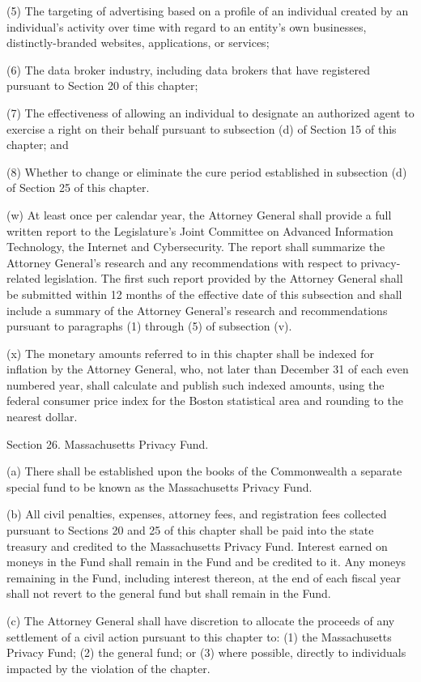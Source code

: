 (5) The targeting of advertising based on a profile of an individual created by an individual’s activity over time with regard to an entity’s own businesses, distinctly-branded websites, applications, or services;

(6) The data broker industry, including data brokers that have registered pursuant to Section 20 of this chapter;

(7) The effectiveness of allowing an individual to designate an authorized agent to exercise a right on their behalf pursuant to subsection (d) of Section 15 of this chapter; and

(8) Whether to change or eliminate the cure period established in subsection (d) of Section 25 of this chapter.

(w) At least once per calendar year, the Attorney General shall provide a full written report to the Legislature’s Joint Committee on Advanced Information Technology, the Internet and Cybersecurity. The report shall summarize the Attorney General’s research and any recommendations with respect to privacy-related legislation. The first such report provided by the Attorney General shall be submitted within 12 months of the effective date of this subsection and shall include a summary of the Attorney General’s research and recommendations pursuant to paragraphs (1) through (5) of subsection (v).

(x) The monetary amounts referred to in this chapter shall be indexed for inflation by the Attorney General, who, not later than December 31 of each even numbered year, shall calculate and publish such indexed amounts, using the federal consumer price index for the Boston statistical area and rounding to the nearest dollar. 

Section 26. Massachusetts Privacy Fund.

(a) There shall be established upon the books of the Commonwealth a separate special fund to be known as the Massachusetts Privacy Fund.

(b) All civil penalties, expenses, attorney fees, and registration fees collected pursuant to Sections 20 and 25 of this chapter shall be paid into the state treasury and credited to the Massachusetts Privacy Fund. Interest earned on moneys in the Fund shall remain in the Fund and be credited to it. Any moneys remaining in the Fund, including interest thereon, at the end of each fiscal year shall not revert to the general fund but shall remain in the Fund.

(c) The Attorney General shall have discretion to allocate the proceeds of any settlement of a civil action pursuant to this chapter to: (1) the Massachusetts Privacy Fund; (2) the general fund; or (3) where possible, directly to individuals impacted by the violation of the chapter. 

